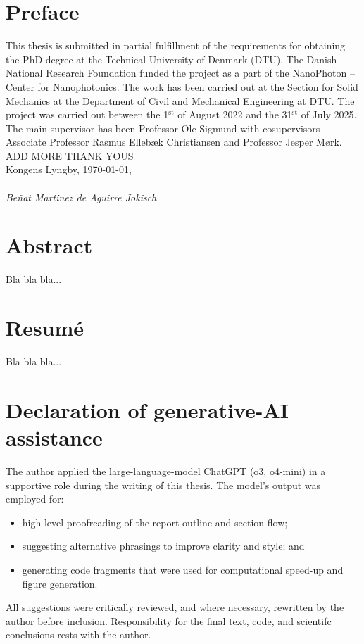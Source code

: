 \chapter*{Preface}

This thesis is submitted in partial fulfillment of the requirements for obtaining
the PhD degree at the Technical University of Denmark
(DTU). The Danish National Research Foundation funded the project as a part of
the NanoPhoton -- Center for Nanophotonics. The work has been carried out at the
Section for Solid Mechanics at the Department of Civil and Mechanical Engineering
at DTU. The project was carried out between the 1$^\text{st}$ of August 2022 and the 31$^\text{st}$
of July 2025. The main supervisor has been Professor Ole Sigmund with cosupervisors Associate Professor Rasmus Ellebæk Christiansen and Professor Jesper
Mørk.\\

ADD MORE THANK YOUS\\

\noindent Kongens Lyngby, \today,\\
\vspace{0.1cm}\\
\noindent \textit{Beñat Martinez de Aguirre Jokisch}

\chapter*{Abstract}

Bla bla bla...

\chapter*{Resumé}

Bla bla bla...

\chapter*{Declaration of generative-AI assistance}

The author applied the large-language-model ChatGPT (o3, o4-mini) in a supportive role
during the writing of this thesis. The model's output was employed for:
\begin{itemize}
\item high-level proofreading of the report outline and section flow;
\item suggesting alternative phrasings to improve clarity and style; and
\item generating code fragments that were used for computational speed-up and figure generation.
\end{itemize}
All suggestions were critically reviewed, and where necessary, rewritten by the author before
inclusion. Responsibility for the final text, code, and scientifc conclusions rests with the author.

